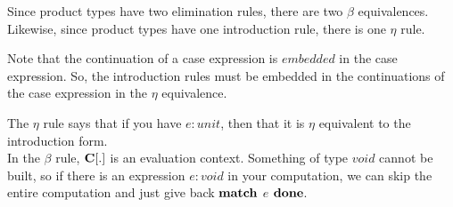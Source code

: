 \documentclass{notes}
\begin{document}

\begin{nb}
  Since product types have two elimination rules, there are two $\beta$ equivalences.
  Likewise, since product types have one introduction rule, there is one $\eta$ rule.
\end{nb}


\begin{nb}
  Note that the continuation of a case expression is $embedded$ in the case
  expression. So, the introduction rules must be embedded in the continuations
  of the case expression in the $\eta$ equivalence.
\end{nb}


\begin{nb}
  The $\eta$ rule says that if you have $e : unit$, then that it is $\eta$
  equivalent to the introduction form.
  \\
  In the $\beta$ rule, $\bf{C}[.]$ is an evaluation context. Something of type 
  $void$ cannot be built, so if there is an expression $e : void$ in your
  computation, we can skip the entire computation and just give back 
  $\bf{match}$ $e$ $\bf{done}$.
\end{nb}
\end{document}
